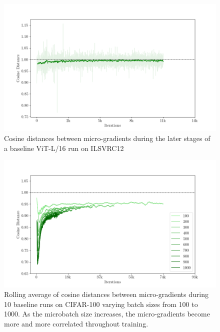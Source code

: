 \begin{figure}[ht]
    \centering
    \includegraphics[width=0.975\linewidth]{figures/figure_1_5_Baseline_Run_ImageNet_ViT_L_Cosine_Distance.png}
    \caption{Cosine distances between micro-gradients during the later stages of a baseline ViT-L/16 run on ILSVRC12}
    \label{fig:baseline_vit_run}
\end{figure}

\begin{figure}[ht]
    \centering
    \includegraphics[width=0.975\linewidth]{figures/figure_2_Baseline_Run_CIFAR100_over_Batch_Size_3.png}
    \caption{Rolling average of cosine distances between micro-gradients during 10 baseline runs on CIFAR-100 varying batch sizes from 100 to 1000. As the microbatch size increases, the micro-gradients become more and more correlated throughout training.}
    \label{fig:baseline_cifar100_batchsize}
\end{figure}


